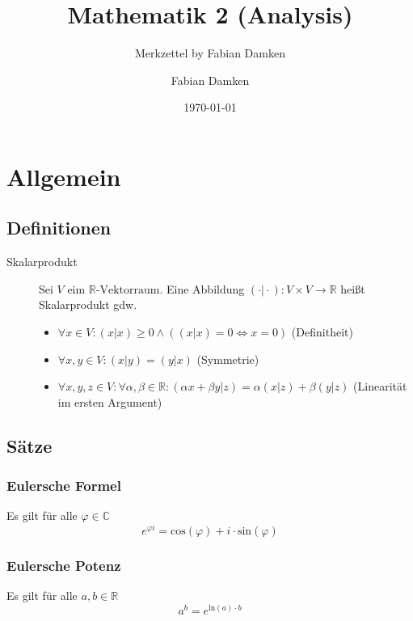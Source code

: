 \documentclass[a4paper, 11pt, accentcolor = tud3b]{tudreport}
\title{Mathematik 2 (Analysis)}
\subtitle{Merkzettel by Fabian Damken}
\author{Fabian Damken}
\date{\today}
\begin{document}
    \maketitle
    \tableofcontents
    \listoftodos


    \chapter{Allgemein}
        \section{Definitionen}
            \begin{description}
                \item[Skalarprodukt] Sei $ V $ eim $ \mathbb{R}\text{-Vektorraum} $. Eine Abbildung $ (\cdot \vert \cdot) : V \times V \rightarrow \mathbb{R} $ heißt Skalarprodukt gdw.
                    \begin{itemize}
                        \item $ \forall x \in V : (x \vert x) \geq 0 \land ((x \vert x) = 0 \iff x = 0) $ (Definitheit)
                        \item $ \forall x, y \in V : (x \vert y) = (y \vert x) $ (Symmetrie)
                        \item $ \forall x, y, z \in V : \forall \alpha, \beta \in \mathbb{R} : (\alpha x + \beta y \vert z) = \alpha (x \vert z) + \beta (y \vert z) $ (Linearität im ersten Argument)
                    \end{itemize}
            \end{description}

        \section{Sätze}
            \subsection{Eulersche Formel}
                Es gilt für alle $ \varphi \in \mathbb{C} $ \[ e ^ { \varphi i } = \text{cos}(\varphi) + i \cdot \text{sin}(\varphi) \]

            \subsection{Eulersche Potenz}
                Es gilt für alle $ a, b \in \mathbb{R} $ \[ a ^ b = e ^ { \text{ln}(a) \cdot b } \]
\end{document}
